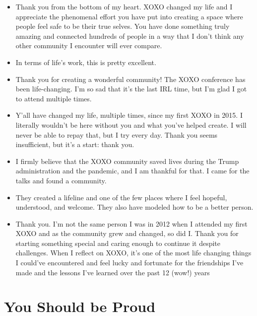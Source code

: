 \documentclass[
]{book}
\providecommand{\tightlist}{%
  \setlength{\itemsep}{0pt}\setlength{\parskip}{0pt}}
\begin{document}
\begin{itemize}
\tightlist
\item
  Thank you from the bottom of my heart. XOXO changed my life and I appreciate the phenomenal effort you have put into creating a space where people feel safe to be their true selves. You have done something truly amazing and connected hundreds of people in a way that I don't think any other community I encounter will ever compare.
\item
  In terms of life's work, this is pretty excellent.
\item
  Thank you for creating a wonderful community! The XOXO conference has been life-changing. I'm so sad that it's the last IRL time, but I'm glad I got to attend multiple times.
\item
  Y'all have changed my life, multiple times, since my first XOXO in 2015. I literally wouldn't be here without you and what you've helped create. I will never be able to repay that, but I try every day. Thank you seems insufficient, but it's a start: thank you.
\item
  I firmly believe that the XOXO community saved lives during the Trump administration and the pandemic, and I am thankful for that. I came for the talks and found a community.
\item
  They created a lifeline and one of the few places where I feel hopeful, understood, and welcome. They also have modeled how to be a better person.
\item
  Thank you. I'm not the same person I was in 2012 when I attended my first XOXO and as the community grew and changed, so did I. Thank you for starting something special and caring enough to continue it despite challenges. When I reflect on XOXO, it's one of the most life changing things I could've encountered and feel lucky and fortunate for the friendships I've made and the lessons I've learned over the past 12 (wow!) years
\end{itemize}

\section{You Should be Proud}\label{you-should-be-proud}
\end{document}

